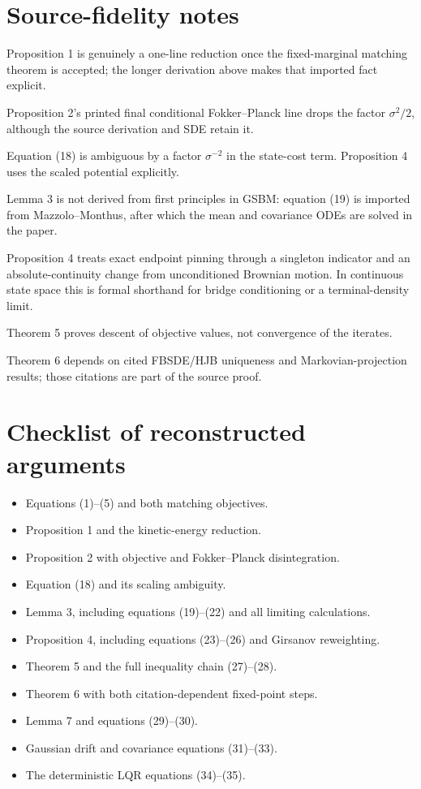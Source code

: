 \section{Source-fidelity notes}
\begin{commentarynotes}
\item Proposition 1 is genuinely a one-line reduction once the fixed-marginal
matching theorem is accepted; the longer derivation above makes that imported
fact explicit.
\item Proposition 2's printed final conditional Fokker--Planck line drops the
factor $\sigma^2/2$, although the source derivation and SDE retain it.
\item Equation (18) is ambiguous by a factor $\sigma^{-2}$ in the state-cost
term.  Proposition 4 uses the scaled potential explicitly.
\item Lemma 3 is not derived from first principles in GSBM: equation (19) is
imported from Mazzolo--Monthus, after which the mean and covariance ODEs are
solved in the paper.
\item Proposition 4 treats exact endpoint pinning through a singleton indicator
and an absolute-continuity change from unconditioned Brownian motion.  In
continuous state space this is formal shorthand for bridge conditioning or a
terminal-density limit.
\item Theorem 5 proves descent of objective values, not convergence of the
iterates.
\item Theorem 6 depends on cited FBSDE/HJB uniqueness and Markovian-projection
results; those citations are part of the source proof.
\end{commentarynotes}

\section*{Checklist of reconstructed arguments}
\begin{itemize}[leftmargin=2em]
\item Equations (1)--(5) and both matching objectives.
\item Proposition 1 and the kinetic-energy reduction.
\item Proposition 2 with objective and Fokker--Planck disintegration.
\item Equation (18) and its scaling ambiguity.
\item Lemma 3, including equations (19)--(22) and all limiting calculations.
\item Proposition 4, including equations (23)--(26) and Girsanov reweighting.
\item Theorem 5 and the full inequality chain (27)--(28).
\item Theorem 6 with both citation-dependent fixed-point steps.
\item Lemma 7 and equations (29)--(30).
\item Gaussian drift and covariance equations (31)--(33).
\item The deterministic LQR equations (34)--(35).
\end{itemize}



